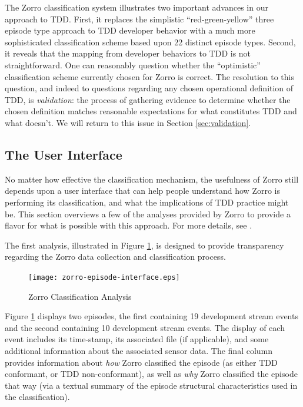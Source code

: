 \documentclass[smallextended]{svjour3}     %
\begin{document}
The Zorro classification system illustrates two important advances in our
approach to TDD.  First, it replaces the simplistic ``red-green-yellow''
three episode type approach to TDD developer behavior with a much more
sophisticated classification scheme based upon 22 distinct episode
types. Second, it reveals that the mapping from developer behaviors to TDD
is not straightforward. One can reasonably question whether the
``optimistic'' classification scheme currently chosen for Zorro is correct.
The resolution to this question, and indeed to questions regarding any
chosen operational definition of TDD, is {\em validation}: the process of
gathering evidence to determine whether the chosen definition matches
reasonable expectations for what constitutes TDD and what doesn't. We will
return to this issue in Section \ref{sec:validation}.

\subsection{The User Interface}

No matter how effective the classification mechanism, the usefulness of Zorro still depends upon a user interface that can help people understand how Zorro is performing its classification, and what the implications of TDD practice might be. 
This section overviews a few of the
analyses provided by Zorro to provide a flavor for what is possible with
this approach. For more details, see \cite{csdl2-07-04}.

The first analysis, illustrated in Figure \ref{fig:Analysis-Table}, is
designed to provide transparency regarding the Zorro data collection and
classification process.

\begin{figure}[th]
  \center
  \texttt{[image: zorro-episode-interface.eps]}
  \caption{Zorro Classification Analysis}
  \label{fig:Analysis-Table}
\end{figure} 

Figure \ref{fig:Analysis-Table} displays two episodes, the first containing
19 development stream events and the second containing 10 development
stream events.  The display of each event includes its time-stamp, its
associated file (if applicable), and some additional information about the
associated sensor data.  The final column provides information about {\em
how} Zorro classified the episode (as either TDD conformant, or TDD
non-conformant), as well as {\em why} Zorro classified the episode that way
(via a textual summary of the episode structural characteristics used in
the classification).  
\end{document}
